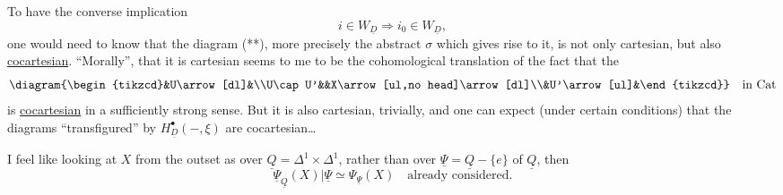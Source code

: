 
To have the converse implication
\[i\in W_{\underline D}\Longrightarrow i_0\in W_{\underline D},\]
one would need to know that the diagram (**), more  precisely the  abstract  $\sigma$ which gives rise to it, is not only cartesian, but also \uline{cocartesian}. ``Morally'', that it is cartesian seems to me to be the cohomological translation of the fact that the 
\[\diagram{\begin{tikzcd}&U\arrow[dl]&\\U\cap U'&&X\arrow[ul,no head]\arrow[dl]\\&U'\arrow[ul]&\end{tikzcd}}\quad\text{in Cat}\]
is \uline{cocartesian} in a sufficiently strong sense. But it is also cartesian, trivially, and one can expect (under certain conditions) that the diagrams ``transfigured'' by $H^\bullet_{\underline D}(-,\xi)$ are cocartesian\ldots

I feel like looking at $X$ from the outset as over $\underline Q=\Delta^1\times\Delta^1$, rather than over  $\underline\Psi=\underline Q-\{e\}$ of $\underline Q$, then
\[\underline\Psi_{\underline Q}(X)|\underline\Psi\simeq\Psi_{\underline\Psi}(X)\quad\text{already considered.}\]
